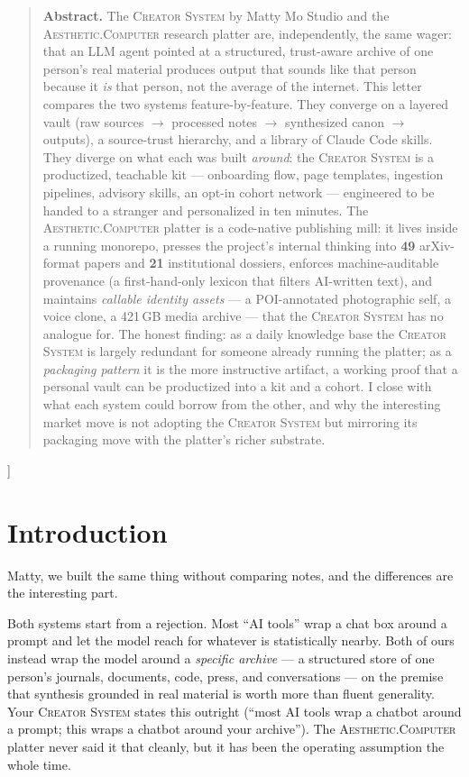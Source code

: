 \documentclass[10pt,letterpaper,twocolumn]{article}
\newcommand{\ac}{\textsc{Aesthetic.Computer}}
\newcommand{\cs}{\textsc{Creator System}}
\begin{document}
{\begin{quote}
\small\noindent\textbf{Abstract.}
The \cs{} by Matty Mo Studio and the \ac{} research platter are, independently, the same wager: that an LLM agent pointed at a structured, trust-aware archive of one person's real material produces output that sounds like that person because it \emph{is} that person, not the average of the internet. This letter compares the two systems feature-by-feature. They converge on a layered vault (raw sources $\rightarrow$ processed notes $\rightarrow$ synthesized canon $\rightarrow$ outputs), a source-trust hierarchy, and a library of Claude Code skills. They diverge on what each was built \emph{around}: the \cs{} is a productized, teachable kit --- onboarding flow, page templates, ingestion pipelines, advisory skills, an opt-in cohort network --- engineered to be handed to a stranger and personalized in ten minutes. The \ac{} platter is a code-native publishing mill: it lives inside a running monorepo, presses the project's internal thinking into \textbf{49} \mbox{arXiv-format} papers and \textbf{21} institutional dossiers, enforces machine-auditable provenance (a first-hand-only lexicon that filters AI-written text), and maintains \emph{callable identity assets} --- a POI-annotated photographic self, a voice clone, a 421\,GB media archive --- that the \cs{} has no analogue for. The honest finding: as a daily knowledge base the \cs{} is largely redundant for someone already running the platter; as a \emph{packaging pattern} it is the more instructive artifact, a working proof that a personal vault can be productized into a kit and a cohort. I close with what each system could borrow from the other, and why the interesting market move is not adopting the \cs{} but mirroring its packaging move with the platter's richer substrate.
\end{quote}
\vspace{0.5em}
}]


\section{Introduction}

Matty, we built the same thing without comparing notes, and the differences are the interesting part.

Both systems start from a rejection. Most ``AI tools'' wrap a chat box around a prompt and let the model reach for whatever is statistically nearby. Both of ours instead wrap the model around a \emph{specific archive} --- a structured store of one person's journals, documents, code, press, and conversations --- on the premise that synthesis grounded in real material is worth more than fluent generality. Your \cs{} states this outright (``most AI tools wrap a chatbot around a prompt; this wraps a chatbot around your archive''). The \ac{} platter never said it that cleanly, but it has been the operating assumption the whole time.
\end{document}
